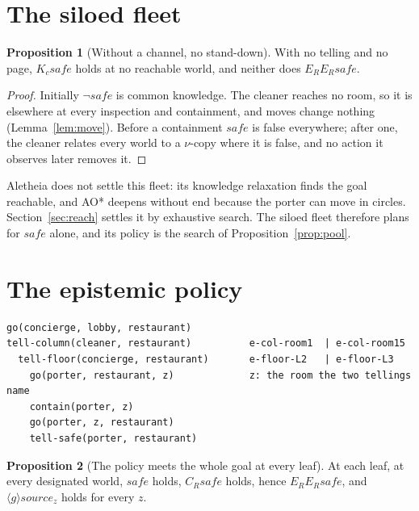 \documentclass[11pt,a4paper]{article}
\theoremstyle{definition}
\newtheorem{proposition}{Proposition}
\newcommand{\safe}{\mathit{safe}}
\newcommand{\src}[1]{\mathit{source}_{#1}}
\begin{document}
\section{The siloed fleet}
\label{sec:siloed}

\begin{proposition}[Without a channel, no stand-down]
\label{prop:siloed}
With no telling and no page, $K_c\safe$ holds at no reachable world, and neither
does $E_RE_R\safe$.
\end{proposition}

\begin{proof}
Initially $\neg\safe$ is common knowledge. The cleaner reaches no room, so it is
elsewhere at every inspection and containment, and moves change nothing
(Lemma~\ref{lem:move}). Before a containment $\safe$ is false everywhere; after
one, the cleaner relates every world to a $\nu$-copy where it is false, and no
action it observes later removes it.
\end{proof}

Aletheia does not settle this fleet: its knowledge relaxation finds the goal
reachable, and AO* deepens without end because the porter can move in circles.
Section~\ref{sec:reach} settles it by exhaustive search. The siloed fleet
therefore plans for $\safe$ alone, and its policy is the search of
Proposition~\ref{prop:pool}.

\section{The epistemic policy}
\label{sec:policy}

\begin{lstlisting}[caption={The policy Aletheia returns for $\gamma$: depth 7, four leaves.}]
go(concierge, lobby, restaurant)
tell-column(cleaner, restaurant)          e-col-room1  | e-col-room15
  tell-floor(concierge, restaurant)       e-floor-L2   | e-floor-L3
    go(porter, restaurant, z)             z: the room the two tellings name
    contain(porter, z)
    go(porter, z, restaurant)
    tell-safe(porter, restaurant)
\end{lstlisting}

\begin{proposition}[The policy meets the whole goal at every leaf]
\label{prop:policy}
At each leaf, at every designated world, $\safe$ holds, $C_R\safe$ holds, hence
$E_RE_R\safe$, and $\langle g\rangle\src{z}$ holds for every $z$.
\end{proposition}
\end{document}
